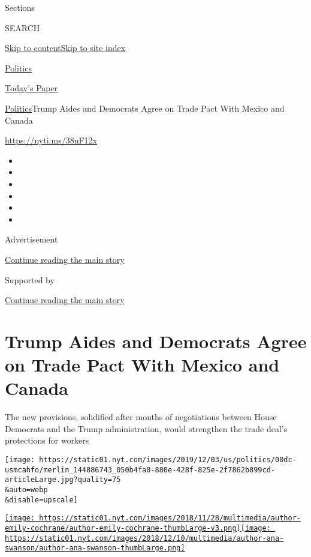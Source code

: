 Sections

SEARCH

\protect\hyperlink{site-content}{Skip to
content}\protect\hyperlink{site-index}{Skip to site index}

\href{https://www.nytimes.com/section/politics}{Politics}

\href{https://myaccount.nytimes.com/auth/login?response_type=cookie\&client_id=vi}{}

\href{https://www.nytimes.com/section/todayspaper}{Today's Paper}

\href{/section/politics}{Politics}\textbar{}Trump Aides and Democrats
Agree on Trade Pact With Mexico and Canada

\url{https://nyti.ms/38nF12x}

\begin{itemize}
\item
\item
\item
\item
\item
\item
\end{itemize}

Advertisement

\protect\hyperlink{after-top}{Continue reading the main story}

Supported by

\protect\hyperlink{after-sponsor}{Continue reading the main story}

\hypertarget{trump-aides-and-democrats-agree-on-trade-pact-with-mexico-and-canada}{%
\section{Trump Aides and Democrats Agree on Trade Pact With Mexico and
Canada}\label{trump-aides-and-democrats-agree-on-trade-pact-with-mexico-and-canada}}

The new provisions, solidified after months of negotiations between
House Democrats and the Trump administration, would strengthen the trade
deal's protections for workers

\texttt{[image: https://static01.nyt.com/images/2019/12/03/us/politics/00dc-usmcahfo/merlin\_144886743\_050b4fa0-880e-428f-825e-2f7862b899cd-articleLarge.jpg?quality=75\\\&auto=webp\\\&disable=upscale]}

\href{https://www.nytimes.com/by/emily-cochrane}{\texttt{[image: https://static01.nyt.com/images/2018/11/28/multimedia/author-emily-cochrane/author-emily-cochrane-thumbLarge-v3.png]}}\href{https://www.nytimes.com/by/ana-swanson}{\texttt{[image: https://static01.nyt.com/images/2018/12/10/multimedia/author-ana-swanson/author-ana-swanson-thumbLarge.png]}}

